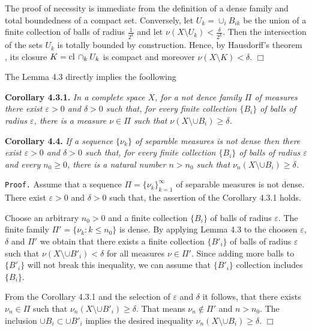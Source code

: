 \documentclass[11pt,a4paper]{article}
\begin{document}
The proof of necessity is immediate from the definition of
a dense family and total boundedness of
a compact set.
Conversely, let $U_k=\cup_i B_{ik}$
be the union of a finite collection of balls of radius $\frac{1}{2^k}$
and let $\nu(X\setminus U_k)<\frac{\delta}{2^k}$.
Then the intersection of the sets $U_k$
is totally bounded by construction. Hence, by
Hausdorff's theorem {\cite[4.6.7.]{Kut}}, its closure $K={\rm cl\,}\cap_k{U_k}$
is compact and moreover $\nu(X\setminus K)<\delta$.
\hbox{$\Box$} \vspace{1em}

The Lemma 4.3 directly implies the foollowing

\vspace{1em} {\bf Corollary 4.3.1.} \sl
In a complete space $X$, for a not dence family $\Pi$ of measures
there exist $\varepsilon>0$ and $\delta>0$ such that,
for every finite collection $\{B_i\}$ of balls of radius $\varepsilon$,
there is a measure $\nu\in \Pi$ such that
$\nu(X \setminus \cup B_i) \ge \delta$. \rm

\vspace{1em} {\bf Corollary 4.4.} \sl
If a sequence $\{\nu_k\}$ of separable measures is not dense
then there exist $\varepsilon>0$ and $\delta>0$ such that,
for every finite collection $\{B_i\}$ of balls of radius $\varepsilon$
and every $n_0\ge 0$, there is a natural number $n>n_0$
such that $\nu_n(X \setminus \cup B_i) \ge \delta$. \rm
\vspace{1em}

{\tt Proof.}
Assume that a sequence
$\Pi=\{\nu_k\}_{k=1}^\infty$
of separable measures is not dense.
There exist $\varepsilon>0$ and $\delta>0$ such that,
the assertion of the Corollary 4.3.1 holds.

Choose an arbitrary $n_0>0$ and
a finite collection $\{B_i\}$ of balls of radius $\varepsilon$.
The finite family $\Pi'=\{\nu_k: k\le n_0\}$ is dense.
By applying Lemma 4.3 to the choosen $\varepsilon$, $\delta$ and $\Pi'$
we obtain that there exists a finite collection $\{B'_i\}$
of balls of radius $\varepsilon$ such that
$\nu(X\setminus \cup B'_i)<\delta$ for all measures $\nu\in\Pi'$.
Since adding more balls to $\{B'_i\}$ will not break this inequality,
we can assume that $\{B'_i\}$ collection includes $\{B_i\}$.

From the Corollary 4.3.1 and the selection of $\varepsilon$ and $\delta$ it follows,
that there exists $\nu_n\in \Pi$ such that
$\nu_n(X \setminus \cup B'_i) \ge \delta$.
That means $\nu_n\not\in\Pi'$ and $n>n_0$.
The inclusion $\cup B_i\subset\cup B'_i$ implies the desired inequality
$\nu_n(X \setminus \cup B_i) \ge \delta$.
\hbox{$\Box$}
\end{document}
